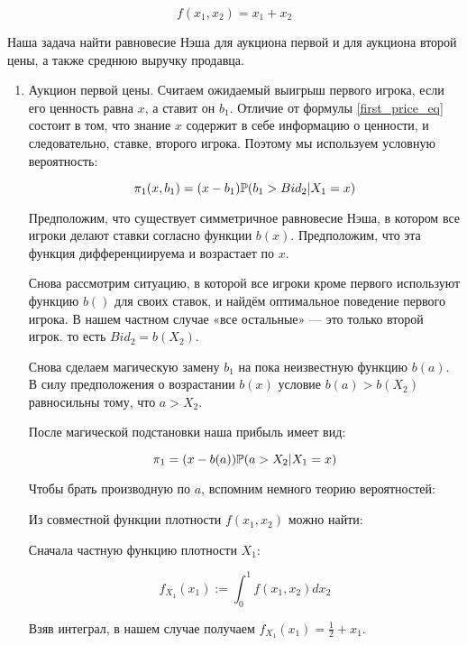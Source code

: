 \begin{equation}
f(x_{1},x_{2})=x_{1}+x_{2}
\end{equation}

Наша задача найти равновесие Нэша для аукциона первой и для аукциона второй цены, а также среднюю выручку продавца.

\begin{enumerate}
\item Аукцион первой цены. Считаем ожидаемый выигрыш первого игрока, если его ценность равна $ x $, а ставит он $ b_{1} $. Отличие от формулы \ref{first_price_eq} состоит в том, что знание $ x $ содержит в себе информацию о ценности, и следовательно, ставке, второго игрока. Поэтому мы используем условную вероятность:

\begin{equation}
\pi_{1}(x,b_{1})=(x-b_{1})\P(b_{1}>Bid_{2} |X_{1}=x)
\end{equation}

Предположим, что существует симметричное равновесие Нэша, в котором все игроки делают ставки согласно функции $ b(x) $. Предположим, что эта функция дифференциируема и возрастает по $ x $.

Снова рассмотрим ситуацию, в которой все игроки кроме первого используют функцию $ b() $ для своих ставок, и найдём оптимальное поведение первого игрока. В нашем частном случае «все остальные» — это только второй игрок. то есть $ Bid_{2}=b(X_{2}) $.

Снова сделаем магическую замену $ b_{1} $ на пока неизвестную функцию $ b(a) $. В силу предположения о возрастании  $ b(x) $ условие $ b(a)>b(X_{2}) $ равносильны тому, что $ a>X_{2} $.

После магической подстановки наша прибыль имеет вид:

\begin{equation}
\pi_{1}=(x-b(a))\P(a>X_{2} |X_{1}=x)
\end{equation}


Чтобы брать производную по $a$, вспомним немного теорию вероятностей:

Из совместной функции плотности $f(x_{1}, x_{2})$ можно найти:

Сначала частную функцию плотности $X_{1}$:

\begin{equation}
f_{X_{1}}(x_{1}):=\int_{0}^{1} f(x_{1},x_{2}) dx_{2}
\end{equation}

Взяв интеграл, в нашем случае получаем $ f_{X_{1}}(x_{1})=\frac{1}{2}+x_{1} $.


\end{enumerate}
